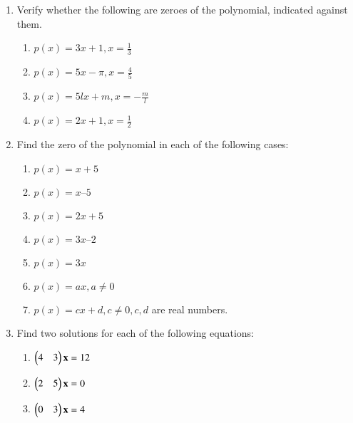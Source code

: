 \renewcommand{\theequation}{\theenumi}
\begin{enumerate}[label=\arabic*.,ref=\thesubsection.\theenumi]
%
 \item Verify whether the following are zeroes of the polynomial, indicated against them. 
\begin{enumerate}
\item $ p(x) = 3x + 1, x = \frac{1}{3}$
\item $ p(x) = 5x -\pi, x = \frac{4}{5}$
\item $ p(x) = 5lx+m, x = -\frac{m}{l}$
\item $ p(x) = 2x+1, x = \frac{1}{2}$
\end{enumerate}
%
\solution 

%
\item Find the zero of the polynomial in each of the following cases: 
\begin{enumerate}
\item $p(x) = x + 5 $
\item $p(x) = x – 5$
\item $p(x) = 2x + 5$
\item $p(x) = 3x – 2$
 \item $p(x) = 3x$
 \item $p(x) = ax, a \ne 0$
\item $p(x) = cx + d, c \ne 0, c, d$ are real numbers.
\end{enumerate}
\solution 

\item Find two solutions for each of the following equations: 
\begin{enumerate}
\item $\begin{pmatrix}4 & 3\end{pmatrix}\mathbf{x} = 12$
\item $\begin{pmatrix} 2 & 5\end{pmatrix}\mathbf{x}  = 0 $
\item $\begin{pmatrix} 0 & 3\end{pmatrix}\mathbf{x}  = 4$
\end{enumerate}
\solution 



\end{enumerate}
